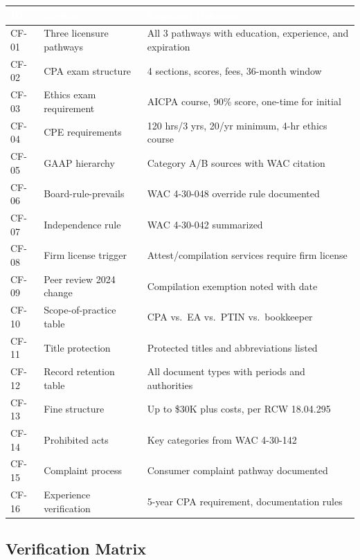 \documentclass[11pt,letterpaper]{article}
\newcommand{\tableheader}[1]{\textbf{\sffamily\textcolor{white}{#1}}}
\begin{document}
\begin{center}
\begin{tabularx}{\textwidth}{C{1.2cm}L{3.5cm}X}
\toprule
{}
\tableheader{ID} & \tableheader{Verifies} & \tableheader{Expected Behavior} \\
\midrule
CF-01 & Three licensure pathways & All 3 pathways with education, experience, and expiration \\
CF-02 & CPA exam structure & 4 sections, scores, fees, 36-month window \\
CF-03 & Ethics exam requirement & AICPA course, 90\% score, one-time for initial \\
CF-04 & CPE requirements & 120 hrs/3 yrs, 20/yr minimum, 4-hr ethics course \\
CF-05 & GAAP hierarchy & Category A/B sources with WAC citation \\
CF-06 & Board-rule-prevails & WAC 4-30-048 override rule documented \\
CF-07 & Independence rule & WAC 4-30-042 summarized \\
CF-08 & Firm license trigger & Attest/compilation services require firm license \\
CF-09 & Peer review 2024 change & Compilation exemption noted with date \\
CF-10 & Scope-of-practice table & CPA vs.\ EA vs.\ PTIN vs.\ bookkeeper \\
CF-11 & Title protection & Protected titles and abbreviations listed \\
CF-12 & Record retention table & All document types with periods and authorities \\
CF-13 & Fine structure & Up to \$30K plus costs, per RCW 18.04.295 \\
CF-14 & Prohibited acts & Key categories from WAC 4-30-142 \\
CF-15 & Complaint process & Consumer complaint pathway documented \\
CF-16 & Experience verification & 5-year CPA requirement, documentation rules \\
\bottomrule
\end{tabularx}
\end{center}

\subsection{Verification Matrix}
\end{document}
